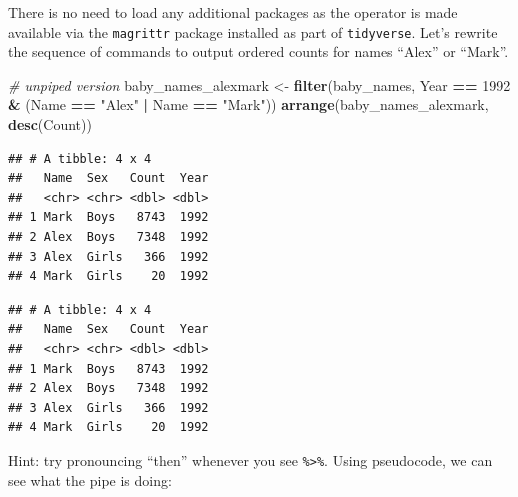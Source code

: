 \documentclass[
]{book}
\newenvironment{Shaded}{\begin{snugshade}}{\end{snugshade}}
\newcommand{\CommentTok}[1]{\textcolor[rgb]{0.56,0.35,0.01}{\textit{#1}}}
\newcommand{\DecValTok}[1]{\textcolor[rgb]{0.00,0.00,0.81}{#1}}
\newcommand{\KeywordTok}[1]{\textcolor[rgb]{0.13,0.29,0.53}{\textbf{#1}}}
\newcommand{\NormalTok}[1]{#1}
\newcommand{\OperatorTok}[1]{\textcolor[rgb]{0.81,0.36,0.00}{\textbf{#1}}}
\newcommand{\StringTok}[1]{\textcolor[rgb]{0.31,0.60,0.02}{#1}}
\begin{document}
There is no need to load any additional packages as the operator is made
available via the \texttt{magrittr} package installed as part of \texttt{tidyverse}. Let's
rewrite the sequence of commands to output ordered counts for names
``Alex'' or ``Mark''.

\begin{Shaded}
\begin{Highlighting}[]
\CommentTok{# unpiped version}
\NormalTok{baby_names_alexmark <-}\StringTok{ }\KeywordTok{filter}\NormalTok{(baby_names, Year }\OperatorTok{==}\StringTok{ }\DecValTok{1992} \OperatorTok{&}\StringTok{ }\NormalTok{(Name }\OperatorTok{==}\StringTok{ "Alex"} \OperatorTok{|}\StringTok{ }\NormalTok{Name }\OperatorTok{==}\StringTok{ "Mark"}\NormalTok{))}
\KeywordTok{arrange}\NormalTok{(baby_names_alexmark, }\KeywordTok{desc}\NormalTok{(Count))}
\end{Highlighting}
\end{Shaded}

\begin{verbatim}
## # A tibble: 4 x 4
##   Name  Sex   Count  Year
##   <chr> <chr> <dbl> <dbl>
## 1 Mark  Boys   8743  1992
## 2 Alex  Boys   7348  1992
## 3 Alex  Girls   366  1992
## 4 Mark  Girls    20  1992
\end{verbatim}

\begin{Shaded}
\end{Shaded}

\begin{verbatim}
## # A tibble: 4 x 4
##   Name  Sex   Count  Year
##   <chr> <chr> <dbl> <dbl>
## 1 Mark  Boys   8743  1992
## 2 Alex  Boys   7348  1992
## 3 Alex  Girls   366  1992
## 4 Mark  Girls    20  1992
\end{verbatim}

Hint: try pronouncing ``then'' whenever you see \texttt{\%\textgreater{}\%}. Using pseudocode,
we can see what the pipe is doing:
\end{document}
